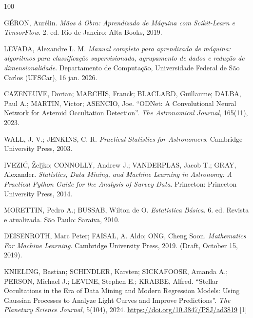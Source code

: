 \documentclass[msc]{on} %
\providecommand{\DIFaddtex}[1]{{\protect\color{red}#1}} %
\providecommand{\DIFaddbegin}{} %
\providecommand{\DIFaddend}{} %
\providecommand{\DIFadd}[1]{\texorpdfstring{\DIFaddtex{#1}}{#1}} %
\begin{document}
\backmatter

%
%

\begin{thebibliography}{100}

 G\'ERON, Aur\'elin. \textit{M\~aos \`a Obra: Aprendizado de M\'aquina com Scikit-Learn e TensorFlow}. 2. ed. Rio de Janeiro: Alta Books, 2019.

 LEVADA, Alexandre L. M. \textit{Manual completo para aprendizado de m\'aquina: algoritmos para classifica\c{c}\~ao supervisionada, agrupamento de dados e redu\c{c}\~ao de dimensionalidade}. Departamento de Computa\c{c}\~ao, Universidade Federal de S\~ao Carlos (UFSCar), 16 jan. 2026.

 CAZENEUVE, Dorian; MARCHIS, Franck; BLACLARD, Guillaume; DALBA, Paul A.; MARTIN, Victor; ASENCIO, Joe. ``ODNet: A Convolutional Neural Network for Asteroid Occultation Detection''. \emph{The Astronomical Journal}, 165(11), 2023.

 WALL, J. V.; JENKINS, C. R. \textit{Practical Statistics for Astronomers}. Cambridge University Press, 2003.

\DIFaddbegin {} \DIFadd{IVEZI\'C, \v{Z}eljko; CONNOLLY, Andrew J.; VANDERPLAS, Jacob T.; GRAY, Alexander. }\textit{\DIFadd{Statistics, Data Mining, and Machine Learning in Astronomy: A Practical Python Guide for the Analysis of Survey Data}}\DIFadd{. Princeton: Princeton University Press, 2014.
}

\DIFaddend {} MORETTIN, Pedro A.; BUSSAB, Wilton de O. \textit{Estatística Básica}. 6. ed. Revista e atualizada. São Paulo: Saraiva, 2010.

 DEISENROTH, Marc Peter; FAISAL, A. Aldo; ONG, Cheng Soon. \textit{Mathematics For Machine Learning}. Cambridge University Press, 2019. (Draft, October 15, 2019).

 KNIELING, Bastian; SCHINDLER, Karsten; SICKAFOOSE, Amanda A.; PERSON, Michael J.; LEVINE, Stephen E.; KRABBE, Alfred. ``Stellar Occultations in the Era of Data Mining and Modern Regression Models: Using Gaussian Processes to Analyze Light Curves and Improve Predictions''. \emph{The Planetary Science Journal}, 5(104), 2024. \url{https://doi.org/10.3847/PSJ/ad3819} [1]


\end{thebibliography}
\end{document}

